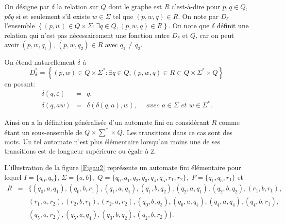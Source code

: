 On désigne par $\delta$ la relation sur $Q$ dont le graphe est $R$  c'est-à-dire pour $p,q\in Q$, $p\delta q$ si et seulement s'il existe $w\in \Sigma$ tel que $(p,w,q)\in R$. On note par $D_{\delta}$ l'ensemble  $\left\lbrace (p,w)\in Q\times \Sigma : \exists q \in Q, (p,w,q)\in R\right\rbrace$. On note que $ \delta$ définit une relation qui n'est pas nécessairement une fonction entre $D_{\delta}$ et $Q$, car on peut avoir $(p,w,q_{1})$, $(p,w,q_{2})\in R$ avec $q_{1}\neq q_{2}$.
\begin{Rem}\label{remaut12}
On étend naturellement  $\delta$ à $$D_{\delta}^{*}=\left\lbrace (p,w)\in Q\times \Sigma^{*} : \exists q \in Q, (p,w,q)\in R \subset Q\times \Sigma^{*}\times Q\right\rbrace$$  en posant:
\begin{eqnarray*}
\delta(q,\varepsilon) &=& q,\\
\delta(q,aw) &= & \delta(\delta(q,a),w), \quad \textit{ avec  } a\in \Sigma \textit{ et } w\in \Sigma^{*}.
\end{eqnarray*}

Ainsi on a la  définition généralisée d'un automate fini en considérant $R$ comme étant un sous-ensemble de  $Q\times \sum^{*}\times Q$. Les transitions dans ce cas sont des mots. Un tel automate n'est plus élémentaire lorsqu'au moins une de ses transitions est de longueur supérieure ou égale à $2$.
\begin{Ex}\label{exautG}
L'illustration de la figure \ref{Figau2} représente un automate fini élémentaire pour lequel  $I=\{q_{0}, q_{2}\}$,  $\Sigma = \{a,b\},$ $Q=\{q_{0}, q_{1}, q_{2}, q_{3}, q_{4}, q_{5}, r_{1}, r_{2}\},$  $F= \{q_{1}, q_{5}, r_{1}\}$ et 
\begin{eqnarray*}
R &=&\{ (q_{0},a,q_{1}), (q_{0},b,r_{1}), (q_{1},a,q_{1}), (q_{1},b,q_{2}), (q_{2},a,q_{1}), (q_{2},b,q_{2}),(r_{1},b,r_{1}),\\
& & (r_{1},a,r_{2}), (r_{2},b,r_{1}), (r_{2},a,r_{2}), (q_{0},b,q_{3}), (q_{0},a,q_{4}), (q_{4},a,q_{4}), (q_{4},b,r_{1}),\\ 
& &(q_{5},a,r_{2}), (q_{5},a,q_{4}), (q_{3},b,q_{2}), (q_{2},b,r_{2})\}.
\end{eqnarray*}
\begin{figure}[!htb]
\begin{minipage}[c]{.01\linewidth}
 \centering
 
 \end{minipage}
 \hfill
 \begin{minipage}[c]{.96\linewidth}
 \centering
\end{minipage}
\end{figure}
\end{Ex}
\end{Rem}
